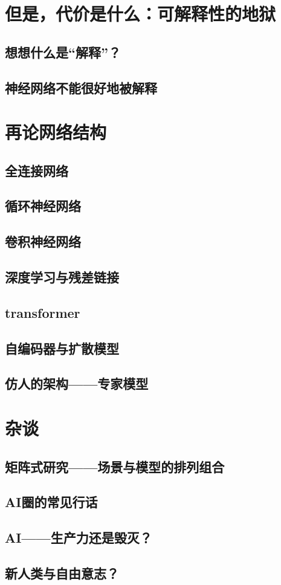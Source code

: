 \documentclass[UTF8, 12pt]{article}
\begin{document}
\section{但是，代价是什么：可解释性的地狱}
\subsection{想想什么是“解释”？}
\subsection{神经网络不能很好地被解释}

\section{再论网络结构} %
\subsection{全连接网络}
\subsection{循环神经网络}
\subsection{卷积神经网络}
\subsection{深度学习与残差链接}
\subsection{transformer}
\subsection{自编码器与扩散模型}
\subsection{仿人的架构——专家模型}

\section{杂谈}
\subsection{矩阵式研究——场景与模型的排列组合}
\subsection{AI圈的常见行话}
\subsection{AI——生产力还是毁灭？}
\subsection{新人类与自由意志？}
\end{document}
